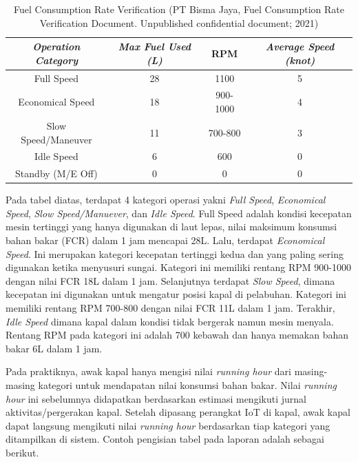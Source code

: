 \begin{table}[!h]
    \caption{ Fuel Consumption Rate Verification (PT Bisma Jaya, Fuel Consumption Rate Verification Document. Unpublished confidential document; 2021)}
    \centering
     \begin{tabular}{c c c c}
        \toprule
        \textit{Operation Category} &
        \textit{Max Fuel Used (L)} &
        RPM &
        \textit{Average Speed (knot)} \\ [0.5ex]
        \midrule
        Full Speed          & 28    & 1100      & 5 \\
        Economical Speed    & 18    & 900-1000  & 4 \\
        Slow Speed/Maneuver & 11    & 700-800   & 3 \\
        Idle Speed          & 6     & 600       & 0 \\
        Standby (M/E Off)   & 0     & 0         & 0 \\ [1ex]
        \bottomrule
    \end{tabular}
     \label{tab:fcrv}
\end{table}

Pada tabel diatas, terdapat 4 kategori operasi yakni \textit{Full Speed}, \textit{Economical Speed}, \textit{Slow Speed/Manuever}, dan \textit{Idle Speed}. Full Speed adalah kondisi kecepatan mesin tertinggi yang hanya digunakan di laut lepas, nilai maksimum konsumsi bahan bakar (FCR) dalam 1 jam mencapai 28L. Lalu, terdapat \textit{Economical Speed}. Ini merupakan kategori kecepatan tertinggi kedua dan yang paling sering digunakan ketika menyusuri sungai. Kategori ini memiliki rentang RPM 900-1000 dengan nilai FCR 18L dalam 1 jam. Selanjutnya terdapat \textit{Slow Speed}, dimana kecepatan ini digunakan untuk mengatur posisi kapal di pelabuhan. Kategori ini memiliki rentang RPM 700-800 dengan nilai FCR 11L dalam 1 jam. Terakhir, \textit{Idle Speed} dimana kapal dalam kondisi tidak bergerak namun mesin menyala. Rentang RPM pada kategori ini adalah 700 kebawah dan hanya memakan bahan bakar 6L dalam 1 jam.

Pada praktiknya, awak kapal hanya mengisi nilai \textit{running hour} dari masing-masing kategori untuk mendapatan nilai konsumsi bahan bakar. Nilai \textit{running hour} ini sebelumnya didapatkan berdasarkan estimasi mengikuti jurnal aktivitas/pergerakan kapal. Setelah dipasang perangkat IoT di kapal, awak kapal dapat langsung mengikuti nilai \textit{running hour} berdasarkan tiap kategori yang ditampilkan di sistem. Contoh pengisian tabel pada laporan adalah sebagai berikut.



